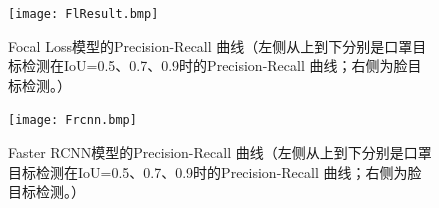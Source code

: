 \documentclass[journal,transmag]{IEEEtran}
\begin{document}
\begin{figure}[h]
\centering
\texttt{[image: FlResult.bmp]}
\caption{Focal Loss模型的Precision-Recall 曲线（左侧从上到下分别是口罩目标检测在IoU=0.5、0.7、0.9时的Precision-Recall 曲线；右侧为脸目标检测。）}
\end{figure}

\begin{figure}[h]
\centering
\texttt{[image: Frcnn.bmp]}
\caption{Faster RCNN模型的Precision-Recall 曲线（左侧从上到下分别是口罩目标检测在IoU=0.5、0.7、0.9时的Precision-Recall 曲线；右侧为脸目标检测。）}
\end{figure}
\end{document}
